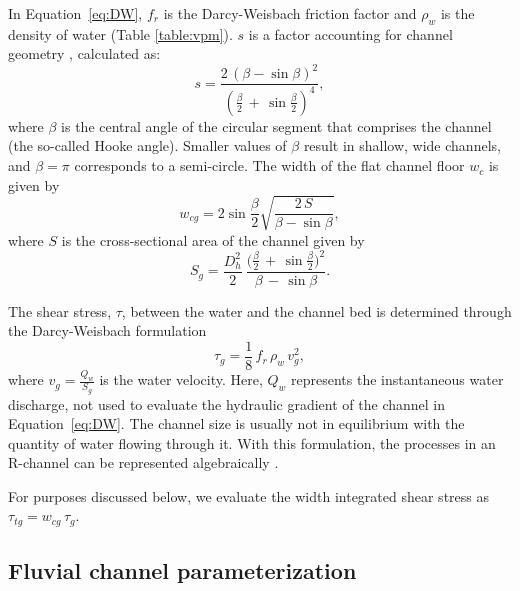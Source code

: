 \documentclass[11pt]{article}
\begin{document}
\begin{spacing}{1}
  In Equation~\ref{eq:DW}, $f_r$ is the Darcy-Weisbach friction factor and $\rho_w$ is the density of water (Table \ref{table:vpm}). $s$ is a factor accounting for channel geometry \citep{hooke1990}, calculated as:
  \begin{equation}
    \label{eq:Hf}
    s = \frac{2\,(\beta -\sin \beta)^2}{(\frac{\beta}{2}\,+\,\sin \frac{\beta}{2})^4},
  \end{equation}
  where $\beta$ is the central angle of the circular segment that comprises the channel (the so-called Hooke angle).
  Smaller values of $\beta$ result in shallow, wide channels, and $\beta =\pi$ corresponds to a semi-circle.
  The width of the flat channel floor $w_c$ is given by
  \begin{equation}
    \label{eq:dh2wc}
    w_{cg} = 2  \sin \frac{\beta}{2} \sqrt{\frac{2\, S}{\beta -\sin \beta}},
  \end{equation}
  where $S$ is the cross-sectional area of the channel given by
  \begin{equation}
    \label{eq:dh2S}
    S_g =  \frac{D_h^2}{2}~ \frac{\Big(\frac{\beta}{2} \,+ \, \sin \frac{\beta}{2}\Big)^2  }{\beta\,-\,\sin \beta}.
  \end{equation}
  
  The shear stress, $\tau$, between the water and the channel bed is determined through the Darcy-Weisbach formulation
  \begin{equation}
    \label{eq:tau}
    \tau_g=\frac{1}{8}\,f_r\,\rho_w\,v_g^2,
  \end{equation}
  where $v_g = \frac{Q_w}{S_g}$ is the water velocity.
  Here, $Q_w$ represents the instantaneous water discharge, not used to evaluate the hydraulic gradient of the channel in Equation~\ref{eq:DW}.
  The channel size is usually not in equilibrium with the quantity of water flowing through it.
  With this formulation, the processes in an R-channel can be represented algebraically \citep{delaney2019}.

  For purposes discussed below, we evaluate the width integrated shear stress as $\tau_{tg}=w_{cg}\,\tau_g $.

  \subsection{Fluvial channel  parameterization}
  \label{sect:fluv}
  

\end{spacing}
\end{document}
